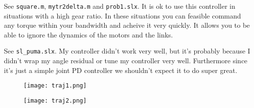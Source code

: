\documentclass{../homework}
\begin{document}
    \begin{problem}
        See \texttt{square.m}, \texttt{mytr2delta.m} and \texttt{prob1.slx}. It is ok to use this controller in situations with a high gear ratio. In these situations you can feasible command any torque within your bandwidth and acheive it very quickly. It allows you to be able to ignore the dynamics of the motors and the links.
    \end{problem}
    \begin{problem}
        See \texttt{sl\_puma.slx}. My controller didn't work very well, but it's probably because I didn't wrap my angle residual or tune my controller very well. Furthermore since it's just a simple joint PD controller we shouldn't expect it to do super great.
      \begin{figure}[H]
        \centering
        \texttt{[image: traj1.png]}
      \end{figure}
      \begin{figure}[H]
        \centering
        \texttt{[image: traj2.png]}
      \end{figure}
    \end{problem}
\end{document}
